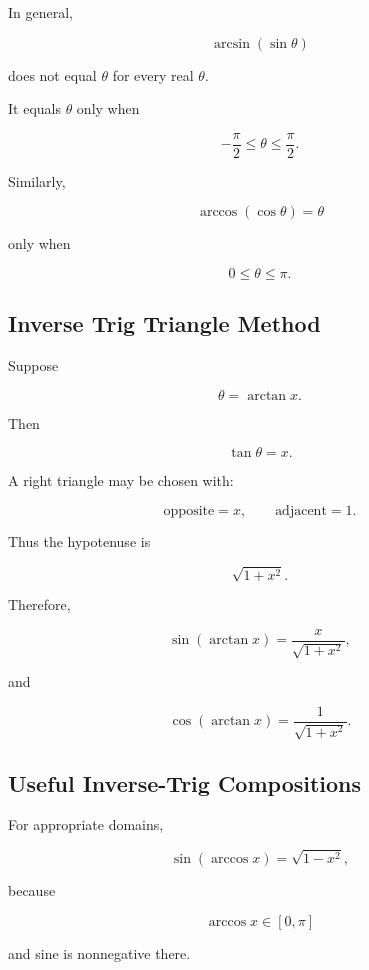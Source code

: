 In general,

\[
\arcsin(\sin\theta)
\]

does not equal \(\theta\) for every real \(\theta\).

It equals \(\theta\) only when

\[
\boxed{
-\frac{\pi}{2}
\leq
\theta
\leq
\frac{\pi}{2}.
}
\]

Similarly,

\[
\arccos(\cos\theta)
=
\theta
\]

only when

\[
\boxed{
0\leq\theta\leq\pi.
}
\]

\subsection{Inverse Trig Triangle Method}
\label{subsec:inverse-trig-triangle-method}

Suppose

\[
\theta
=
\arctan x.
\]

Then

\[
\tan\theta=x.
\]

A right triangle may be chosen with:

\[
\boxed{
\text{opposite}=x,
\qquad
\text{adjacent}=1.
}
\]

Thus the hypotenuse is

\[
\boxed{
\sqrt{1+x^2}.
}
\]

Therefore,

\[
\boxed{
\sin(\arctan x)
=
\frac{x}{\sqrt{1+x^2}},
}
\]

and

\[
\boxed{
\cos(\arctan x)
=
\frac{1}{\sqrt{1+x^2}}.
}
\]

\subsection{Useful Inverse-Trig Compositions}
\label{subsec:useful-inverse-trig-compositions}

For appropriate domains,

\[
\boxed{
\sin(\arccos x)
=
\sqrt{1-x^2},
}
\]

because

\[
\arccos x
\in[0,\pi]
\]

and sine is nonnegative there.

